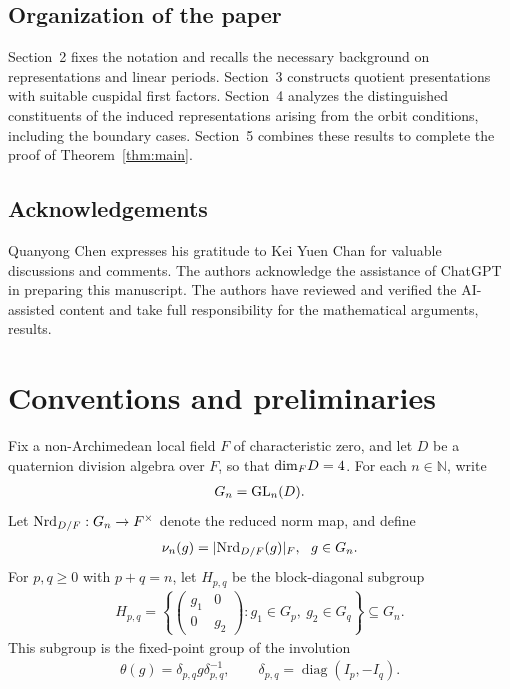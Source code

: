 \documentclass[11pt,leqno]{amsart}
\numberwithin{equation}{section}
\theoremstyle{plain}
\theoremstyle{definition}
\theoremstyle{remark}
\begin{document}
	\subsection*{Organization of the paper}
	
	Section~2 fixes the notation and recalls the necessary
	background on representations and linear periods.
	Section~3 constructs quotient presentations with suitable
	cuspidal first factors.
	Section~4 analyzes the distinguished constituents of
	the induced representations arising from the orbit
	conditions, including the boundary cases.
	Section~5 combines these results to complete the proof
	of Theorem~\ref{thm:main}.
	\subsection*{Acknowledgements}
	Quanyong Chen expresses his gratitude to Kei Yuen Chan for valuable discussions and comments. 
	The authors acknowledge the assistance of ChatGPT in preparing this manuscript. The authors have reviewed and verified the AI-assisted content and take full responsibility for the
	mathematical arguments, results.
	
	
	
	
	
	\section{Conventions and preliminaries}	
	Fix a non-Archimedean local field $F$ of characteristic zero, and let $D$ be a quaternion division algebra over $F$, so that ${\rm dim}_FD=4$. 
	For each $n \in \mathbb N$, write
	\begin{align*}
		G_n={\rm GL}_n(D).
	\end{align*}
	Let ${\rm Nrd}_{D/F}: G_n \rightarrow  F^\times$
	denote the reduced norm map, and define
	\begin{align*}
		\nu_n(g)=|{\rm Nrd}_{D/F}(g)|_F, \ \ g \in G_n.
	\end{align*}
	For $p,q\geq 0$ with $p+q=n$, let $H_{p,q}$ be the
	block-diagonal subgroup
	\begin{align*}
		H_{p,q}=\left\{\begin{pmatrix}g_1&0\\0&g_2\end{pmatrix}:g_1\in G_p,\ g_2\in G_q\right\} \subseteq G_n.
	\end{align*}
	This subgroup is the fixed-point group of the involution
	\begin{align*}
		\theta(g)=\delta_{p,q}g\delta_{p,q}^{-1},
		\qquad
		\delta_{p,q}=\operatorname{diag}(I_p,-I_q).
	\end{align*}
	
\end{document}
